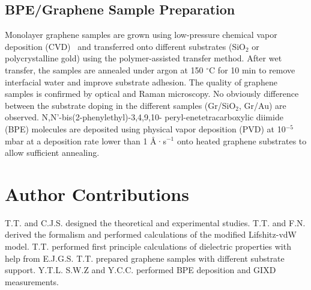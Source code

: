 \subsection{BPE/Graphene Sample Preparation}
\label{sec:graph-sample-prep}

Monolayer graphene samples are grown using low-pressure chemical vapor
deposition (CVD)~\cite{Li_2009_science_cvd} and transferred onto
different substrates (SiO$_{2}$ or poly\-crystalline gold) using the
polymer-assisted transfer method.
%
After wet transfer, the samples are annealed under argon at 150
$^{\circ}$C for 10 min to remove interfacial water and improve substrate adhesion.
%
The quality of graphene samples is confirmed by
optical and Raman microscopy.
%
No obviously difference between the substrate doping in the different
samples (Gr/SiO$_{2}$, Gr/Au) are observed.
N,N’-bis(2-phenyl\-ethyl)-3,4,9,10- peryl-ene\-tetra\-carboxylic
diimide (BPE) molecules are deposited using physical vapor deposition
(PVD) at 10$^{-5}$ mbar at a deposition rate lower than 1 \AA·s$^{-1}$
onto heated graphene substrates to allow sufficient annealing.
%
  

\section{Author Contributions}
\label{sec:vdw-author-contributions}
T.T. and C.J.S. designed the theoretical and experimental
studies. T.T. and F.N. derived the formalism and performed
calculations of the modified Lifshitz-vdW model. T.T. performed first
principle calculations of dielectric properties with help from
E.J.G.S. T.T. prepared graphene samples with different substrate
support.  Y.T.L. S.W.Z and Y.C.C. performed BPE deposition and GIXD
measurements.











